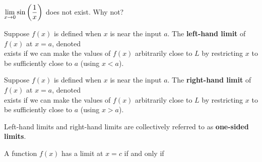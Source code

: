 \documentclass[notes]{subfiles}
\begin{document}
		\begin{ex}
			\(\displaystyle \lim_{x\to 0} \sin \left( \dfrac{1}{x}\right)\) does not exist. Why not?
		\end{ex}
			
		\begin{defn}
			Suppose \(f(x)\) is defined when \(x\) is near the input \(a\).  The \textbf{left-hand limit} of \(f(x)\) at \(x=a\), denoted \\[50pt]
			exists if we can make the values of \(f(x)\) arbitrarily close to \(L\) by restricting \(x\) to be sufficiently close to \(a\) (using \(x < a\)).
		\end{defn}
		\begin{defn}
			Suppose \(f(x)\) is defined when \(x\) is near the input \(a\).  The \textbf{right-hand limit} of \(f(x)\) at \(x=a\), denoted \\[50pt]
			exists if we can make the values of \(f(x)\) arbitrarily close to \(L\) by restricting \(x\) to be sufficiently close to \(a\) (using \(x > a\)).
		\end{defn}
		
		Left-hand limits and right-hand limits are collectively referred to as \textbf{one-sided limits}.
			\newpage
			
		\begin{rmk}
			A function \(f(x)\) has a limit at \(x = c\) if and only if\\[50pt]
		\end{rmk}
			
\end{document}

